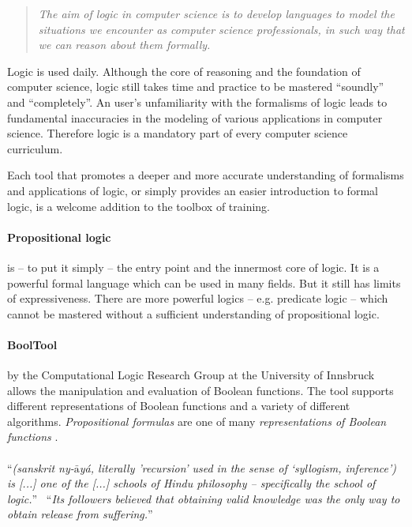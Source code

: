 
\begin{quote}
\em The aim of logic in computer science is to develop languages 
to model the situations we encounter as computer science professionals, 
in such way that we can reason about them formally. \cite[p.1]{Huth:2004:LCS:975331}
\end{quote}

Logic is used daily. Although the core of reasoning and the foundation of computer science, 
logic still takes time and practice to be mastered “soundly” and “completely”. 
An user’s unfamiliarity with the formalisms of logic leads to fundamental inaccuracies 
in the modeling of various applications in computer science. 
Therefore logic is a mandatory part of every computer science curriculum. 

Each tool that promotes a deeper and more accurate understanding of formalisms and applications of logic,
or simply provides an easier introduction to formal logic, 
is a welcome addition to the toolbox of training.


\paragraph{Propositional logic}is – to put it simply – the entry point and the innermost core of logic. 
It is a powerful formal language which can be used in many fields. 
But it still has limits of expressiveness.
There are more powerful logics – e.g. predicate logic –
which cannot be mastered without a sufficient understanding of propositional logic.

\paragraph{BoolTool}by the Computational Logic Research Group at the University of Innsbruck allows the manipulation and evaluation of Boolean functions. The tool supports different representations of Boolean functions and a variety of different algorithms.
{\em Propositional formulas} are one of many {\em representations of Boolean functions} \cite[p.159]{Huth:2004:LCS:975331}.

\paragraph{\Nyaya}“{\em (sanskrit ny-$\bar{\mbox{a}}$yá, literally 'recursion’  used in the sense of  ‘syllogism, inference’) is [...] one of the [...] schools of Hindu philosophy – specifically the school of logic.}”\ \cite{WIKIPEDIA:NYAYA}
“{\em Its followers believed that obtaining valid knowledge was the only way  to obtain release from suffering.}”\ \cite{IEP:NYAYA} 


